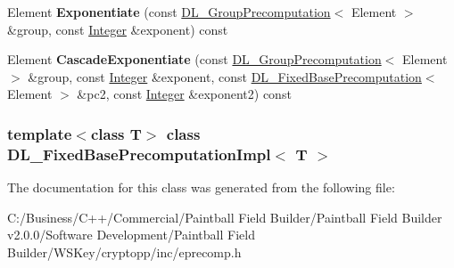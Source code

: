 \begin{DoxyCompactItemize}
\item 
\hypertarget{class_d_l___fixed_base_precomputation_impl_a095358ce89175c67ef795245f6f787ce}{
Element {\bfseries Exponentiate} (const \hyperlink{class_d_l___group_precomputation}{DL\_\-GroupPrecomputation}$<$ Element $>$ \&group, const \hyperlink{class_integer}{Integer} \&exponent) const }
\label{class_d_l___fixed_base_precomputation_impl_a095358ce89175c67ef795245f6f787ce}

\item 
\hypertarget{class_d_l___fixed_base_precomputation_impl_a7ceea36f3abd33dc45ca492aa31a6f96}{
Element {\bfseries CascadeExponentiate} (const \hyperlink{class_d_l___group_precomputation}{DL\_\-GroupPrecomputation}$<$ Element $>$ \&group, const \hyperlink{class_integer}{Integer} \&exponent, const \hyperlink{class_d_l___fixed_base_precomputation}{DL\_\-FixedBasePrecomputation}$<$ Element $>$ \&pc2, const \hyperlink{class_integer}{Integer} \&exponent2) const }
\label{class_d_l___fixed_base_precomputation_impl_a7ceea36f3abd33dc45ca492aa31a6f96}

\end{DoxyCompactItemize}
\subsubsection*{template$<$class T$>$ class DL\_\-FixedBasePrecomputationImpl$<$ T $>$}



The documentation for this class was generated from the following file:\begin{DoxyCompactItemize}
\item 
C:/Business/C++/Commercial/Paintball Field Builder/Paintball Field Builder v2.0.0/Software Development/Paintball Field Builder/WSKey/cryptopp/inc/eprecomp.h\end{DoxyCompactItemize}
